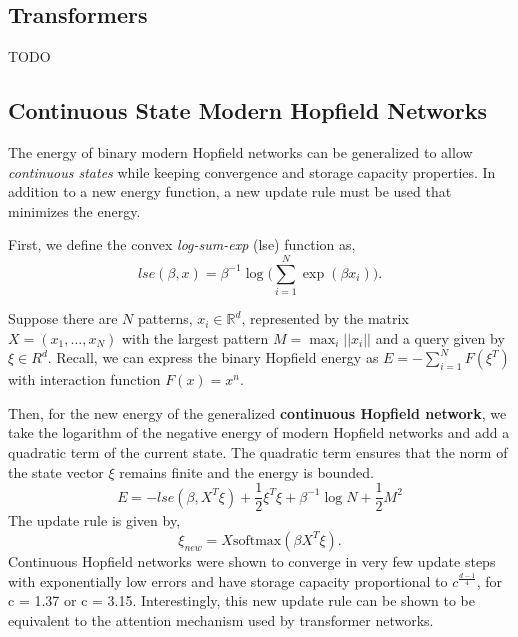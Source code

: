 \documentclass{article}
\begin{document}
\subsection{Transformers}
TODO

\subsection{Continuous State Modern Hopfield Networks}

The energy of binary modern Hopfield networks can be generalized to allow \textit{continuous states} while keeping convergence and storage capacity properties. In addition to a new energy function, a new update rule must be used that minimizes the energy. 

First, we define the convex \textit{log-sum-exp} (lse) function as,
\[
    lse(\beta, x) = \beta^{-1} \log \bigg (  \sum_{i=1}^{N} \exp(\beta x_i) \bigg).
\]

Suppose there are $N$ patterns, $x_i \in \mathbb R^d$, represented by the matrix $X = (x_1, \dots, x_N)$ with the largest pattern $M = \max_i ||x_i||$ and a query given by $\xi \in R^d$. Recall, we can express the binary Hopfield energy as $E = -\sum_{i=1}^N F(\xi^T)$  with interaction function $F(x) = x^n$.

Then, for the new energy of the generalized \textbf{continuous Hopfield network}, we take the logarithm of the negative energy of modern Hopfield networks and add a quadratic term of the current state. The quadratic term ensures that the norm of the state vector $\xi$ remains finite and the energy is bounded.
\[
    E = -lse(\beta, X^T \xi) + \frac{1}{2}\xi^T\xi + \beta^{-1}\log N +\frac{1}{2} M^2
\]
The update rule is given by,
\[
    \xi_{new} = X \text{softmax}(\beta X^T \xi).
\]
Continuous Hopfield networks were shown to converge in very few update steps with exponentially low errors and have storage capacity proportional to $c^{\frac{d-1}{4}}$,  for c = 1.37 or c = 3.15. Interestingly, this new update rule can be shown to be equivalent to the attention mechanism used by transformer networks.





\end{document}
